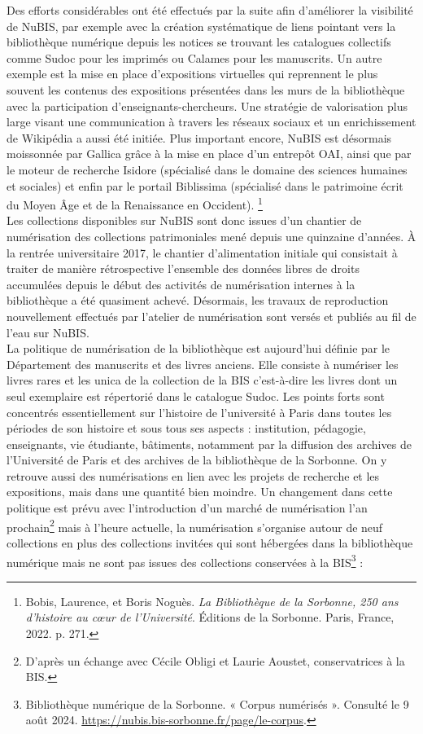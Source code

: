 \documentclass[a4paper,12pt,twoside]{book}
\begin{document}
Des efforts considérables ont été effectués par la suite afin d'améliorer la visibilité de NuBIS, par exemple avec la création systématique de liens pointant vers la bibliothèque numérique depuis les notices se trouvant les catalogues collectifs comme Sudoc pour les imprimés ou Calames pour les manuscrits. Un autre exemple est la mise en place d'expositions virtuelles qui reprennent le plus souvent les contenus des expositions présentées dans les murs de la bibliothèque avec la participation d'enseignants-chercheurs. Une stratégie de valorisation plus large visant une communication à travers les réseaux sociaux et un enrichissement de Wikipédia a aussi été initiée. Plus important encore, NuBIS est désormais moissonnée par Gallica grâce à la mise en place d'un entrepôt OAI, ainsi que par le moteur de recherche Isidore (spécialisé dans le domaine des sciences humaines et sociales) et enfin par le portail Biblissima (spécialisé dans le patrimoine écrit du Moyen Âge et de la Renaissance en Occident). \footnote{Bobis, Laurence, et Boris Noguès. \emph{La Bibliothèque de la Sorbonne, 250 ans d’histoire au cœur de l’Université}. Éditions de la Sorbonne. Paris, France, 2022. p. 271.}  \\


Les collections disponibles sur NuBIS sont donc issues d'un chantier de
numérisation des collections patrimoniales mené depuis une quinzaine
d'années. À la rentrée universitaire 2017, le chantier d'alimentation initiale qui consistait à traiter de manière rétrospective l'ensemble des données libres de droits accumulées depuis le début des activités de numérisation internes à la bibliothèque a été quasiment achevé. Désormais, les travaux de reproduction nouvellement effectués par l'atelier de numérisation sont versés et publiés au fil de l'eau sur NuBIS. \\

La politique de numérisation de la bibliothèque est aujourd'hui définie par le Département des manuscrits et des livres anciens. Elle consiste à numériser les livres rares et
les unica de la collection de la BIS c'est-à-dire les
livres dont un seul exemplaire est répertorié dans le catalogue Sudoc.
Les points forts sont concentrés essentiellement sur l'histoire de
l'université à Paris dans toutes les périodes de son histoire et sous
tous ses aspects : institution, pédagogie, enseignants, vie étudiante,
bâtiments, notamment par la diffusion des archives de
l'Université de Paris et des archives de la bibliothèque
de la Sorbonne. On y retrouve aussi des numérisations en lien avec les
projets de recherche et les expositions, mais dans une quantité bien
moindre. Un changement dans cette politique est prévu avec
l'introduction d'un marché de numérisation
l'an prochain\footnote{D'après un échange avec Cécile
	Obligi et Laurie Aoustet, conservatrices à la BIS.} mais à l'heure
actuelle, la numérisation s'organise autour de neuf collections en plus
des collections invitées qui sont hébergées dans la bibliothèque numérique mais ne sont pas issues des
collections conservées à la BIS\footnote{Bibliothèque numérique de la
	Sorbonne. « Corpus numérisés ». Consulté le 9 août 2024.
	\url{https://nubis.bis-sorbonne.fr/page/le-corpus}.}
: \\
\end{document}
